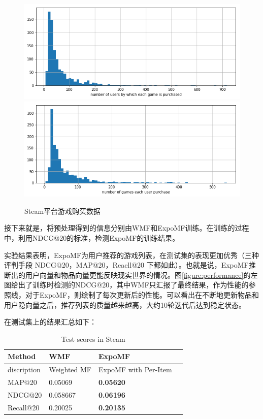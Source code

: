 \documentclass[notitlepage,cs4size,punct,oneside]{ctexrep}
\numberwithin{equation}{chapter}
\theoremstyle{mystyle}
\begin{document}
\begin{figure}[h]
 \includegraphics[width=\textwidth]{./results/game_play_by.png}
 \includegraphics[width=\textwidth]{./results/user_play_game.png}
 \caption{Steam平台游戏购买数据}
 \label{figure:steam}
\end{figure}

接下来就是，将预处理得到的信息分别由WMF和ExpoMF训练。在训练的过程中，利用NDCG@20的标准，检测ExpoMF的训练结果。
\par
实验结果表明，ExpoMF为用户推荐的游戏列表，在测试集的表现更加优秀（三种评判手段 NDCG@20，MAP@20，Reacll@20 下都如此）。也就是说，ExpoMF推断出的用户向量和物品向量更能反映现实世界的情况。图\ref{figure:performance}的左图给出了训练时检测的NDCG@20，其中WMF只汇报了最终结果，作为性能的参照线，对于ExpoMF，则绘制了每次更新后的性能。可以看出在不断地更新物品和用户隐向量之后，推荐列表的质量越来越高，大约10轮迭代后达到稳定状态。


在测试集上的结果汇总如下：
\begin{table}[htbp]\centering
\begin{tabular}{llll}
\hline\hline
Method             & WMF          & ExpoMF      \\
\hline
discription  	  &Weighted MF    & ExpoMF with Per-Item          \\
MAP@20  		  & 0.05069       & \textbf{0.05620}       \\
NDCG@20           & 0.058667      & \textbf{0.06196}               \\
Recall@20         & 0.20025       & \textbf{0.20135}              \\

\hline
\end{tabular}
\caption{Test scores in Steam}\label{tab:performance_steam}
\end{table}
\end{document}
